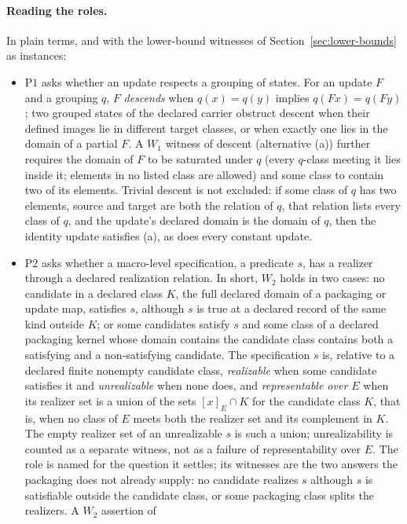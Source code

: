 \documentclass[11pt]{article}
\theoremstyle{definition}
\newcommand{\Pone}{\ensuremath{\mathrm{P1}}}
\newcommand{\Ptwo}{\ensuremath{\mathrm{P2}}}
\begin{document}
\paragraph{Reading the roles.} In plain terms, and with the lower-bound
witnesses of Section~\ref{sec:lower-bounds} as instances:
\begin{itemize}[topsep=2pt,itemsep=1pt]
  \item \Pone{} asks whether an update respects a grouping of states. For
    an update \(F\) and a grouping \(q\), \(F\) \emph{descends} when
    \(q(x)=q(y)\) implies \(q(Fx)=q(Fy)\); two grouped states of the declared carrier obstruct descent when their defined images lie in different target classes, or when exactly one lies in the domain of a partial \(F\). A \(W_1\) witness of descent (alternative (a)) further requires the domain of \(F\) to be saturated under \(q\) (every \(q\)-class meeting it lies inside it; elements in no listed class are allowed) and some class to contain two of its elements. Trivial descent is not excluded: if some class of \(q\) has two elements, source and target are both the relation of \(q\), that relation lists every class of \(q\), and the update's declared domain is the domain of \(q\), then the identity update satisfies (a), as does every constant update.
  \item \Ptwo{} asks whether a macro-level specification, a predicate
    \(s\), has a realizer through a declared realization relation. In short, \(W_2\)
    holds in two cases: no candidate in a declared class \(K\), the full
    declared domain of a packaging or update map, satisfies \(s\), although \(s\)
    is true at a declared record of the same kind outside \(K\); or some
    candidates satisfy \(s\) and some class of a declared packaging kernel whose
    domain contains the candidate class contains both a satisfying and a
    non-satisfying candidate. The
    specification \(s\) is, relative to a declared finite nonempty candidate
    class, \emph{realizable} when some candidate satisfies it and
    \emph{unrealizable} when none does, and \emph{representable over \(E\)} when
    its realizer set is a union of the sets \([x]_E\cap K\) for the candidate
    class \(K\), that is, when no class of \(E\) meets both the realizer set and
    its complement in \(K\). The empty realizer set of an
    unrealizable \(s\) is such a union; unrealizability is counted
    as a separate witness, not as a failure of representability over \(E\). The role is named for the question it settles; its witnesses are the two answers the packaging does not already supply: no candidate realizes \(s\) although \(s\) is satisfiable outside the candidate class, or some packaging class splits the realizers. A \(W_2\) assertion of

\end{itemize}
\end{document}
